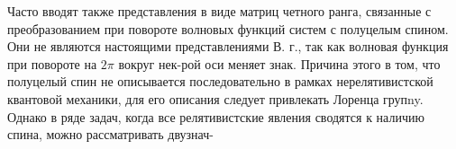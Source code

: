 \documentclass[10pt]{article}
\begin{document}
Часто вводят также представления в виде матриц четного ранга, связанные с преобразованием при повороте волновых функций систем с полуцелым спином. Они не являются настоящими представлениями В. г., так как волновая функция при повороте на $2 \pi$ вокруг нек-рой оси меняет знак. Причина этого в том, что полуцелый спин не описывается последовательно в рамках нерелятивистской квантовой механики, для его описания следует привлекать Лоренца групny. Однако в ряде задач, когда все релятивистские явления сводятся к наличию спина, можно рассматривать двузнач-
\end{document}
